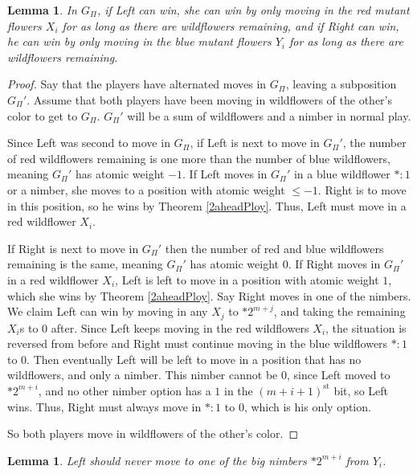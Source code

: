 \documentclass{amsart}
\theoremstyle{plain}
\newtheorem{lemma}[thm]{Lemma}
\theoremstyle{definition}
\theoremstyle{remark}
\numberwithin{equation}{section}
\numberwithin{thm}{section}
\begin{document}
\begin{lemma}
    In $G_{\Pi}$, if Left can win, she can win by only moving in the red mutant flowers $X_i$ for as long as there are wildflowers remaining, and if Right can win, he can win by only moving in the blue mutant flowers $Y_i$ for as long as there are wildflowers remaining. 
\end{lemma}
\begin{proof}
     Say that the players have alternated moves in $G_{\Pi}$, leaving a subposition $G_{\Pi}'$. Assume that both players have been moving in wildflowers of the other's color to get to $G_{\Pi}$. $G_{\Pi}'$ will be a sum of wildflowers and a nimber in normal play.

     Since Left was second to move in $G_{\Pi}$, if Left is next to move in $G_{\Pi}'$, the number of red wildflowers remaining is one more than the number of blue wildflowers, meaning $G_{\Pi}'$ has atomic weight $-1$. If Left moves in $G_{\Pi}'$ in a blue wildflower $*:1$ or a nimber, she moves to a position with atomic weight $\leq -1$. Right is to move in this position, so he wins by Theorem \ref{2aheadPloy}. Thus, Left must move in a red wildflower $X_i$.

If Right is next to move in $G_{\Pi}'$ then the number of red and blue wildflowers remaining is the same, meaning $G_{\Pi}'$ has atomic weight $0$. If Right moves in $G_{\Pi}'$ in a red wildflower $X_i$, Left is left to move in a position with atomic weight $1$, which she wins by Theorem \ref{2aheadPloy}. Say Right moves in one of the nimbers. We claim Left can win by moving in any $X_j$ to $*2^{m+j}$, and taking the remaining $X_i$s to $0$ after. Since Left keeps moving in the red wildflowers $X_i$, the situation is reversed from before and Right must continue moving in the blue wildflowers $*:1$ to $0$. Then eventually Left will be left to move in a position that has no wildflowers, and only a nimber. This nimber cannot be $0$, since Left moved to $*2^{m+i}$, and no other nimber option has a $1$ in the $(m+i+1)^{\text{st}}$ bit, so Left wins. Thus, Right must always move in $*:1$ to $0$, which is his only option.

So both players move in wildflowers of the other's color.
\end{proof}
\begin{lemma}
    Left should never move to one of the big nimbers $*2^{m+i}$ from $Y_i$.
\end{lemma}
\end{document}

